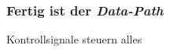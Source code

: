 \documentclass[t,aspectratio=169]{beamer}
\begin{document}
\begin{frame}
  \frametitle{Fertig ist der \emph{Data-Path}}

  \strut{} Kontrollsignale steuern alles

  \begin{center}
  \end{center}
\end{frame}
\end{document}
